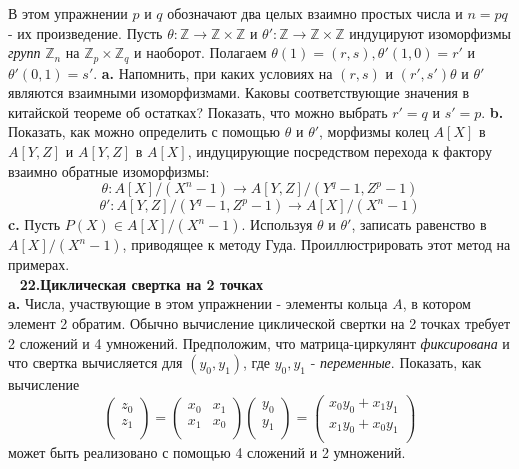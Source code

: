 \documentclass{mai_book}
\begin{document}
В этом упражнении $p$ и $q$ обозначают два целых взаимно простых числа и $n=pq$ - их произведение. Пусть $\theta : \mathbb{Z}\rightarrow \mathbb{Z} \times \mathbb{Z}$ и $\theta ' : \mathbb{Z}\rightarrow \mathbb{Z} \times \mathbb{Z}$ индуцируют изоморфизмы \textit{групп} $\mathbb{Z}_n$ на $\mathbb{Z}_p \times \mathbb{Z}_q$ и наоборот. Полагаем $\theta (1)=(r,s), \theta '(1,0)=r'$ и $\theta '(0,1)=s'$.\newline
\hspace*{15pt}\textbf{a.} Напомнить, при каких условиях на $(r,s)$ и $(r',s')\theta$ и $\theta '$ являются взаимными изоморфизмами. Каковы соответствующие значения в китайской теореме об остатках? Показать, что можно выбрать $r'=q$ и $s'=p$.\newline
\hspace*{15pt}\textbf{b.} Показать, как можно определить с помощью $\theta$ и $\theta '$, морфизмы колец $A[X]$ в $A[Y,Z]$ и $A[Y,Z]$ в $A[X]$, индуцирующие посредством перехода к фактору взаимно обратные изоморфизмы:
$$
\theta : A[X]/(X^n-1)\rightarrow A[Y,Z]/(Y^q-1, Z^p-1)
$$
$$
\text{} \theta ' : A[Y,Z]/(Y^q-1, Z^p-1)\rightarrow A[X]/(X^n-1)
$$
\newline
\hspace*{15pt}\textbf{c.} Пусть $P(X)\in A[X]/(X^n-1)$. Используя $\theta$ и $\theta '$, записать равенство в $A[X]/(X^n-1)$, приводящее к методу Гуда. Проиллюстрировать этот метод на примерах.\\
\ \newline
\noindent\textbf{22.Циклическая свертка на 2 точках} \\

\hspace*{15pt}\textbf{a.} Числа, участвующие в этом упражнении - элементы кольца $A$, в котором элемент 2 обратим. Обычно вычисление циклической свертки на 2 точках требует 2 сложений и 4 умножений. Предположим, что матрица-циркулянт \textit{фиксирована} и что свертка вычисляется для $(y_0, y_1)$, где $y_0, y_1$ - \textit{переменные}. Показать, как вычисление
$$
\begin{pmatrix}
	    z_0 \\
	    z_1 \\
\end{pmatrix} = 
\begin{pmatrix}
	    x_0 & x_1 \\
	    x_1 & x_0 \\
\end{pmatrix}
\begin{pmatrix}
	    y_0 \\
	    y_1 \\
\end{pmatrix} = 
\begin{pmatrix}
	    x_0y_0 + x_1y_1 \\
	    x_1y_0 + x_0y_1 \\
\end{pmatrix}
$$
\newpage
\noindent
может быть реализовано с помощью 4 сложений и 2 умножений.
\end{document}
